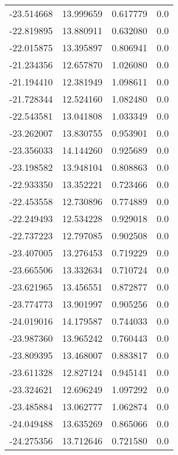 \begin{tabular}{rrrr}
      -23.514668 &        13.999659 &    0.617779 &   0.0 \\
      -22.819895 &        13.880911 &    0.632080 &   0.0 \\
      -22.015875 &        13.395897 &    0.806941 &   0.0 \\
      -21.234356 &        12.657870 &    1.026080 &   0.0 \\
      -21.194410 &        12.381949 &    1.098611 &   0.0 \\
      -21.728344 &        12.524160 &    1.082480 &   0.0 \\
      -22.543581 &        13.041808 &    1.033349 &   0.0 \\
      -23.262007 &        13.830755 &    0.953901 &   0.0 \\
      -23.356033 &        14.144260 &    0.925689 &   0.0 \\
      -23.198582 &        13.948104 &    0.808863 &   0.0 \\
      -22.933350 &        13.352221 &    0.723466 &   0.0 \\
      -22.453558 &        12.730896 &    0.774889 &   0.0 \\
      -22.249493 &        12.534228 &    0.929018 &   0.0 \\
      -22.737223 &        12.797085 &    0.902508 &   0.0 \\
      -23.407005 &        13.276453 &    0.719229 &   0.0 \\
      -23.665506 &        13.332634 &    0.710724 &   0.0 \\
      -23.621965 &        13.456551 &    0.872877 &   0.0 \\
      -23.774773 &        13.901997 &    0.905256 &   0.0 \\
      -24.019016 &        14.179587 &    0.744033 &   0.0 \\
      -23.987360 &        13.965242 &    0.760443 &   0.0 \\
      -23.809395 &        13.468007 &    0.883817 &   0.0 \\
      -23.611328 &        12.827124 &    0.945141 &   0.0 \\
      -23.324621 &        12.696249 &    1.097292 &   0.0 \\
      -23.485884 &        13.062777 &    1.062874 &   0.0 \\
      -24.049488 &        13.635269 &    0.865066 &   0.0 \\
      -24.275356 &        13.712646 &    0.721580 &   0.0 \\

\end{tabular}
